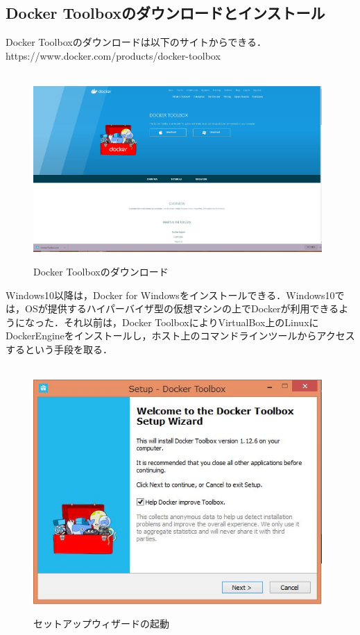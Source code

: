 \subsection{Docker Toolboxのダウンロードとインストール}
Docker Toolboxのダウンロードは以下のサイトからできる．https://www.docker.com/products/docker-toolbox　
\begin{figure}[htb]
\centering　
\includegraphics[width=11cm]{2.JPG}
\caption{Docker Toolboxのダウンロード}\label{tab:uac}
\end{figure}

Windows10以降は，Docker for Windowsをインストールできる．Windows10では，OSが提供するハイパーバイザ型の仮想マシンの上でDockerが利用できるようになった．それ以前は，Docker ToolboxによりVirtualBox上のLinuxにDockerEngineをインストールし，ホスト上のコマンドラインツールからアクセスするという手段を取る．
\newpage

\begin{figure}[htb]
\centering　
\includegraphics[width=11cm]{3.JPG}
\caption{セットアップウィザードの起動}\label{tab:uac}
\end{figure}

